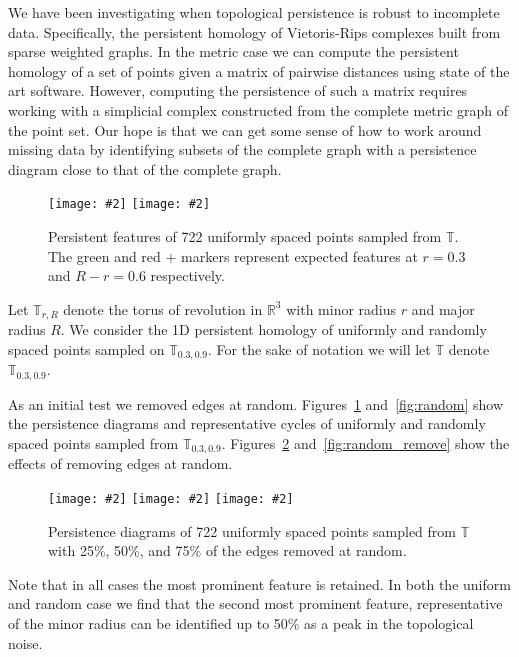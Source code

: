 \documentclass[11pt]{article}
\newcommand{\topleft}[2]{\texttt{[image: \#2]}}
\newcommand{\topright}[2]{\texttt{[image: \#2]}}
\newcommand{\bottomleft}[2]{\texttt{[image: \#2]}}
\begin{document}
We have been investigating when topological persistence is robust to incomplete data.
Specifically, the persistent homology of Vietoris-Rips complexes built from sparse weighted graphs.
In the metric case we can compute the persistent homology of a set of points given a matrix of pairwise distances using state of the art software.
However, computing the persistence of such a matrix requires working with a simplicial complex constructed from the complete metric graph of the point set.
Our hope is that we can get some sense of how to work around missing data by identifying subsets of the complete graph with a persistence diagram close to that of the complete graph.

\begin{figure}[ht]
        \centering
        \topleft{0.4}{figures/722uniform3quarter.pdf}
        \topright{0.4}{figures/722uniform3quarter.pdf}
        \caption{Persistent features of 722 uniformly spaced points sampled from $\mathbb{T}$. The green and red $+$ markers represent expected features at $r=0.3$ and $R-r=0.6$ respectively.}\label{fig:uniform}
\end{figure}

Let $\mathbb{T}_{r,R}$ denote the torus of revolution in $\mathbb{R}^3$ with minor radius $r$ and major radius $R$.
We consider the 1D persistent homology of uniformly and randomly spaced points sampled on $\mathbb{T}_{0.3,0.9}$.
For the sake of notation we will let $\mathbb{T}$ denote $\mathbb{T}_{0.3,0.9}$.

As an initial test we removed edges at random.
Figures~\ref{fig:uniform} and~\ref{fig:random} show the persistence diagrams and representative cycles of uniformly and randomly spaced points sampled from $\mathbb{T}_{0.3,0.9}$.
Figures~\ref{fig:uniform_remove} and~\ref{fig:random_remove} show the effects of removing edges at random.

\begin{figure}[ht]
        \bottomleft{0.32}{figures/722uniform3quarter.pdf}
        \bottomleft{0.32}{figures/722uniformhalf.pdf}
        \bottomleft{0.32}{figures/722uniformquarter.pdf}
        \caption{Persistence diagrams of 722 uniformly spaced points sampled from $\mathbb{T}$ with 25\%, 50\%, and 75\% of the edges removed at random.}\label{fig:uniform_remove}
\end{figure}

Note that in all cases the most prominent feature is retained.
In both the uniform and random case we find that the second most prominent feature, representative of the minor radius can be identified up to 50\% as a peak in the topological noise.
\end{document}
